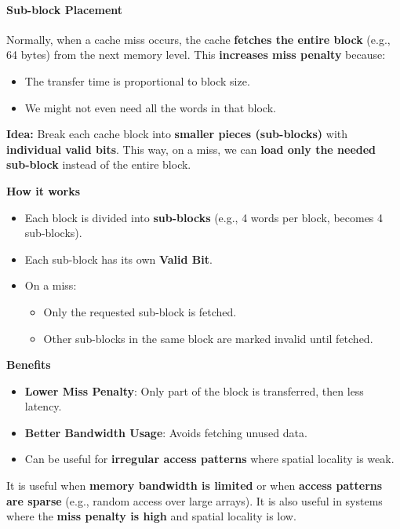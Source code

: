 \paragraph{Sub-block Placement}\label{paragraph: Sub-block Placement}

Normally, when a cache miss occurs, the cache \textbf{fetches the entire block} (e.g., 64 bytes) from the next memory level. This \textbf{increases miss penalty} because:
\begin{itemize}
    \item The transfer time is proportional to block size.
    \item We might not even need all the words in that block.
\end{itemize}
\textbf{Idea:} Break each cache block into \textbf{smaller pieces (sub-blocks)} with \textbf{individual valid bits}. This way, on a miss, we can \textbf{load only the needed sub-block} instead of the entire block.


\highspace
\begin{flushleft}
    \textcolor{Green3}{ \textbf{How it works}}
\end{flushleft}
\begin{itemize}
    \item Each block is divided into \textbf{sub-blocks} (e.g., 4 words per block, becomes 4 sub-blocks).
    \item Each sub-block has its own \textbf{Valid Bit}.
    \item On a miss:
    \begin{itemize}
        \item Only the requested sub-block is fetched.
        \item Other sub-blocks in the same block are marked invalid until fetched.
    \end{itemize}
\end{itemize}

\highspace
\begin{flushleft}
    \textcolor{Green3}{ \textbf{Benefits}}
\end{flushleft}
\begin{itemize}
    \item[\textcolor{Green3}{\faIcon{check}}] \textbf{Lower Miss Penalty}: Only part of the block is transferred, then less latency.
    \item[\textcolor{Green3}{\faIcon{check}}] \textbf{Better Bandwidth Usage}: Avoids fetching unused data.
    \item[\textcolor{Green3}{\faIcon{check}}] Can be useful for \textbf{irregular access patterns} where spatial locality is weak.
\end{itemize}
It is useful when \textbf{memory bandwidth is limited} or when \textbf{access patterns are sparse} (e.g., random access over large arrays). It is also useful in systems where the \textbf{miss penalty is high} and spatial locality is low.

